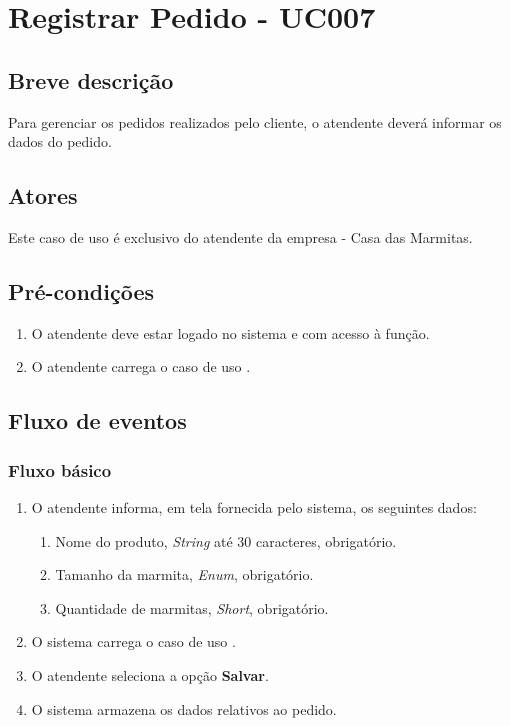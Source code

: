\chapter{Registrar Pedido - UC007} \label{uc007}

\section{Breve descrição}

Para gerenciar os pedidos realizados pelo cliente, o atendente deverá informar os dados do pedido.

\section{Atores}

Este caso de uso é exclusivo do atendente da empresa - Casa das Marmitas.

\section{Pré-condições}

\begin{enumerate}
	\item O atendente deve estar logado no sistema e com acesso à função.
	\item O atendente carrega o caso de uso .
\end{enumerate}

\section{Fluxo de eventos}

\subsection{Fluxo básico}

\begin{enumerate}
	\item O atendente informa, em tela fornecida pelo sistema, os seguintes dados:
	\begin{enumerate}
		\item Nome do produto, \emph{String} até 30 caracteres, obrigatório.
		\item Tamanho da marmita, \emph{Enum}, obrigatório.
		\item Quantidade de marmitas, \emph{Short}, obrigatório.		
	\end{enumerate}
	\item O sistema carrega o caso de uso .
	\item O atendente seleciona a opção \textbf{Salvar}.
	\item O sistema armazena os dados relativos ao pedido.
\end{enumerate}

